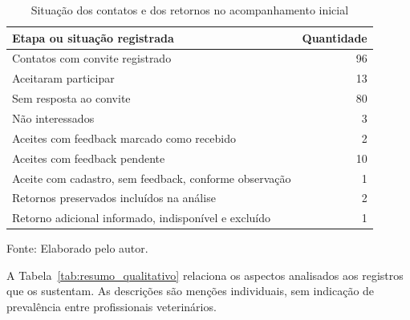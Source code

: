\documentclass{UNESC}
\begin{document}
\begin{table}[htbp]
\centering
\caption{Situação dos contatos e dos retornos no acompanhamento inicial}
\label{tab:recrutamento}
\small
\setlength{\tabcolsep}{5pt}
\renewcommand{\arraystretch}{1.1}
\begin{tabular}{@{}p{} r@{}}
\hline
\textbf{Etapa ou situação registrada} & \textbf{Quantidade} \\
\hline
Contatos com convite registrado & 96 \\
Aceitaram participar & 13 \\
Sem resposta ao convite & 80 \\
Não interessados & 3 \\
Aceites com feedback marcado como recebido & 2 \\
Aceites com feedback pendente & 10 \\
Aceite com cadastro, sem feedback, conforme observação & 1 \\
Retornos preservados incluídos na análise & 2 \\
Retorno adicional informado, indisponível e excluído & 1 \\
\hline
\end{tabular}
\par\vspace{2pt}
{\footnotesize\raggedright Fonte: Elaborado pelo autor.\par}
\end{table}

A Tabela~\ref{tab:resumo_qualitativo} relaciona os aspectos analisados aos registros que os sustentam. As descrições são menções individuais, sem indicação de prevalência entre profissionais veterinários.
\end{document}

